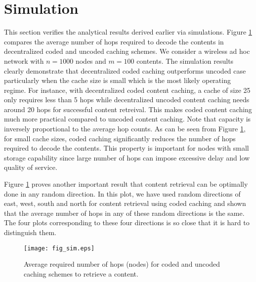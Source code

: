 \documentclass[10pt,journal]{IEEEtran}
\begin{document}
{\section{Simulation}
\label{sim_sec}
This section verifies the analytical results derived earlier via simulations.
%
Figure \ref{fig_hop} compares the average number of hops required to decode the contents in decentralized coded and uncoded caching schemes.
We consider a wireless ad hoc network with $n=1000$ nodes and $m=100$ contents. 
The simulation results clearly demonstrate that decentralized coded caching outperforms uncoded case particularly when the cache size is small which is the most likely operating regime. For instance, with decentralized coded content caching, a cache of size 25 only requires less than 5 hops while decentralized uncoded content caching needs around 20 hops for successful content retreival. This makes coded content caching much more practical compared to uncoded content caching. Note that capacity is inversely proportional to the average hop counts. As can be seen from Figure \ref{fig_hop}, for small cache sizes, coded caching significantly reduces the number of hops required to decode the contents. This property is important for nodes with small storage capability since large number of hops can impose excessive delay and low quality of service.

Figure \ref{fig_hop} proves another important result that content retrieval can be optimally done in any random direction. In this plot, we have used random directions of east, west, south and north for content retrieval using coded caching and shown that the average number of hops in any of these random directions is the same. The four plots corresponding to these four directions is so close that it is hard to distinguish  them.

\begin{figure}
    \center
      \texttt{[image: fig\_sim.eps]}
\caption{Average required number of hops (nodes) for coded and uncoded caching schemes to retrieve a content.}
\vspace{-0.2in}
\label{fig_hop}
\end{figure}

}
\end{document}
